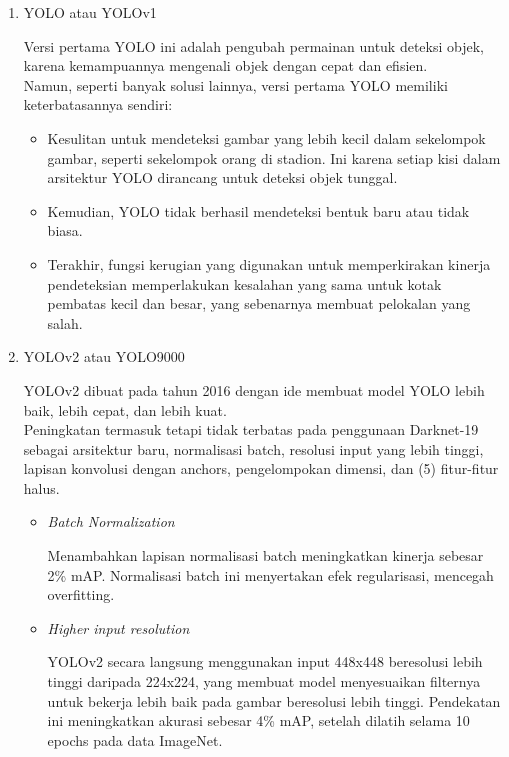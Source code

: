 \begin{enumerate}
	\item YOLO atau YOLOv1
	
	Versi pertama YOLO ini adalah pengubah permainan untuk deteksi objek, karena kemampuannya mengenali objek dengan cepat dan efisien.\\
	Namun, seperti banyak solusi lainnya, versi pertama YOLO memiliki keterbatasannya sendiri:
	\begin{itemize}
		\item Kesulitan untuk mendeteksi gambar yang lebih kecil dalam sekelompok gambar, seperti sekelompok orang di stadion. Ini karena setiap kisi dalam arsitektur YOLO dirancang untuk deteksi objek tunggal.
		
		\item Kemudian, YOLO tidak berhasil mendeteksi bentuk baru atau tidak biasa.
		
		\item Terakhir, fungsi kerugian yang digunakan untuk memperkirakan kinerja pendeteksian memperlakukan kesalahan yang sama untuk kotak pembatas kecil dan besar, yang sebenarnya membuat pelokalan yang salah.
	\end{itemize}
	
	\item YOLOv2 atau YOLO9000
	
	YOLOv2 dibuat pada tahun 2016 dengan ide membuat model YOLO lebih baik, lebih cepat, dan lebih kuat.\\
	Peningkatan termasuk tetapi tidak terbatas pada penggunaan Darknet-19 sebagai arsitektur baru, normalisasi batch, resolusi input yang lebih tinggi, lapisan konvolusi dengan anchors, pengelompokan dimensi, dan (5) fitur-fitur halus.
	
	\begin{itemize}
		\item \textit{Batch Normalization}
		
		Menambahkan lapisan normalisasi batch meningkatkan kinerja sebesar 2\% mAP. Normalisasi batch ini menyertakan efek regularisasi, mencegah overfitting.
		
		\item \textit{Higher input resolution}
		
		YOLOv2 secara langsung menggunakan input 448x448 beresolusi lebih tinggi daripada 224x224, yang membuat model menyesuaikan filternya untuk bekerja lebih baik pada gambar beresolusi lebih tinggi. Pendekatan ini meningkatkan akurasi sebesar 4\% mAP, setelah dilatih selama 10 epochs pada data ImageNet.
	\end{itemize}
	

\end{enumerate}
